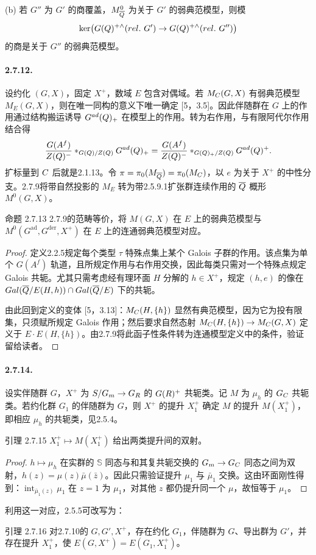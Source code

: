 (b) 若 $G''$ 为 $G'$ 的商覆盖，$M_{\overline{Q}}^0$ 为关于 $G'$ 的弱典范模型，则模
\[
 \ker\bigl(G(Q)^{+\wedge}(rel.\ G')\to G(Q)^{+\wedge}(rel.\ G'')\bigr)
\]
的商是关于 $G''$ 的弱典范模型。
\paragraph*{2.7.12.} 设约化 $(G,X)$，固定 $X^+$，数域 $E$ 包含对偶域。若 $M_{C}(G,X)$ 有弱典范模型 $M_E(G,X)$，则在唯一同构的意义下唯一确定 [5，3.5]。因此伴随群在 $G$ 上的作用通过结构搬运诱导 $G^{ad}(Q)_+$ 在模型上的作用。转为右作用，与有限阿代尔作用结合得
\[
 \frac{G(A^f)}{Z(Q)^-}*_{G(Q)/Z(Q)}G^{ad}(Q)_+
 =\frac{G(A^f)}{Z(Q)^-}*_{G(Q)_+/Z(Q)}G^{ad}(Q)^+.
\]
扩标量到 $C$ 后就是2.1.13。令 $\pi=\pi_0(M_{\overline{Q}})=\pi_0(M_{C})$，以 $e$ 为关于 $X^+$ 的中性分支。2.7.9将带自然投影的 $M_E$ 转为带2.5.9.1扩张群连续作用的 $\overline{Q}$ 概形 $M^0(G,X)$。
\begin{originaltheorem}{命题 2.7.13}
2.7.9的范畴等价，将 $M(G,X)$ 在 $E$ 上的弱典范模型与 $M^0(G^{\mathrm{ad}},G^{\mathrm{der}},X^+)$ 在 $E$ 上的连通弱典范模型对应。
\end{originaltheorem}
\begin{proof}
定义2.2.5规定每个类型 $\tau$ 特殊点集上某个 Galois 子群的作用。该点集为单个 $G(A^f)$ 轨道，且所规定作用与右作用交换，因此每类只需对一个特殊点规定 Galois 共轭。尤其只需考虑经有理环面 $H$ 分解的 $h\in X^+$，规定 $(h,e)$ 的像在 $Gal(\overline{Q}/E(H,h))\cap Gal(\overline{Q}/E)$ 下的共轭。

由此回到定义的变体 [5，3.13]：$M_{C}(H,\{h\})$ 显然有典范模型，因为它为投有限集，只须赋所规定 Galois 作用；然后要求自然态射 $M_{C}(H,\{h\})\to M_{C}(G,X)$ 定义于 $E\cdot E(H,\{h\})$。由2.7.9将此函子性条件转为连通模型定义中的条件，验证留给读者。
\end{proof}
\paragraph*{2.7.14.} 设实伴随群 $G$，$X^+$ 为 $S/G_{m}\to G_{R}$ 的 $G(R)^+$ 共轭类。记 $M$ 为 $\mu_h$ 的 $G_{C}$ 共轭类。若约化群 $G_1$ 的伴随群为 $G$，则 $X^+$ 的提升 $X_1^+$ 确定 $M$ 的提升 $M(X_1^+)$，即相应 $\mu_h$ 的共轭类，见2.5.4。
\begin{originaltheorem}{引理 2.7.15}
$X_1^+\mapsto M(X_1^+)$ 给出两类提升间的双射。
\end{originaltheorem}
\begin{proof}
$h\mapsto\mu_h$ 在实群的 $\mathbb S$ 同态与和其复共轭交换的 $G_{m}\to G_{C}$ 同态之间为双射，$h(z)=\mu(z)\bar\mu(\bar z)$。因此只需验证提升 $\mu_1$ 与 $\bar\mu_1$ 交换。这由环面刚性得到：$\operatorname{int}_{\bar\mu_1(z)}\mu_1$ 在 $z=1$ 为 $\mu_1$，对其他 $z$ 都仍提升同一个 $\mu$，故恒等于 $\mu_1$。
\end{proof}
利用这一对应，2.5.5可改写为：
\begin{originaltheorem}{引理 2.7.16}
对2.7.10的 $G,G',X^+$，存在约化 $G_1$，伴随群为 $G$、导出群为 $G'$，并存在提升 $X_1^+$，使 $E(G,X^+)=E(G_1,X_1^+)$。
\end{originaltheorem}
